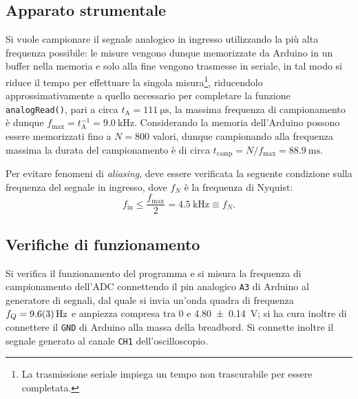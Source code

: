 \documentclass[10pt,oneside,a4paper]{article}
\begin{document}
\begin{multicols}{2}
\section{Apparato strumentale}
Si vuole campionare il segnale analogico in ingresso utilizzando la più alta frequenza possibile: le misure vengono dunque memorizzate da Arduino in un buffer nella memoria e solo alla fine vengono trasmesse in seriale, in tal modo si riduce il tempo per effettuare la singola misura\footnote{La trasmissione seriale impiega un tempo non trascurabile per essere completata.}, riducendolo approssimativamente a quello necessario per completare la funzione \texttt{analogRead()}, pari a circa $t_\text{A} = \SI{111}{\micro\second}$, la massima frequenza di campionamento è dunque $f_\text{max} = t_\text{A}^{-1} = \SI{9.0}{\kilo\hertz}$. Considerando la memoria dell'Arduino possono essere memorizzati fino a $N = 800$ valori, dunque campionando alla frequenza massima la durata del campionamento è di circa $t_\text{camp} = N/f_\text{max} = \SI{88.9}{\milli\second}$.

Per evitare fenomeni di \emph{aliasing}, deve essere verificata la seguente condizione sulla frequenza del segnale in ingresso, dove $f_N$ è la frequenza di Nyquist:
\begin{equation}\label{eq:Nyquist}
	f_\text{in} \leq \frac{f_\text{max}}{2} = \SI{4.5}{\kilo\hertz} \equiv f_N.
\end{equation}

\subsection{Verifiche di funzionamento}
Si verifica il funzionamento del programma e si misura la frequenza di campionamento dell'ADC connettendo il pin analogico \texttt{A3} di Arduino al generatore di segnali, dal quale si invia un'onda quadra di frequenza $f_Q = \SI{9.6 \pm 0.3}{\Hz}$ e ampiezza compresa tra \SI{0}{} e \SI{4.80 \pm 0.14}{V}; si ha cura inoltre di connettere il \texttt{GND} di Arduino alla massa della breadbord. Si connette inoltre il segnale generato al canale \texttt{CH1} dell'oscilloscopio.


\end{multicols}
\end{document}
